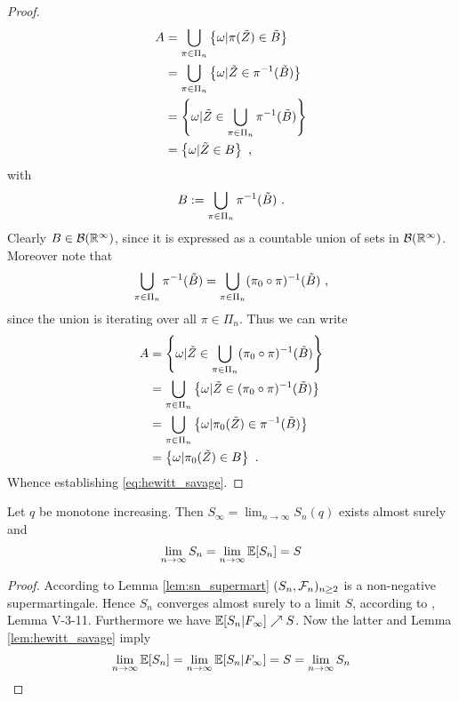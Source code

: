 \begin{lemma}
\begin{proof}
\begin{align*}
		A &= \bigcup\limits_{\pi\in\Pi_n}\left \{\omega | \pi(\tilde{Z}) \in \tilde{B}\right\}\\
		&=  \bigcup\limits_{\pi\in\Pi_n} \left\{\omega | \tilde{Z} \in \pi^{-1}(\tilde{B})\right\}\\
		&=  \left\{\omega | \tilde{Z} \in \bigcup\limits_{\pi\in\Pi_n}\pi^{-1}(\tilde{B})\right\}\\
		&= \left\{\omega | \tilde{Z} \in B\right\}\textrm{ ,}
		\end{align*}		
		with 
		$$B:=\bigcup\limits_{\pi\in\Pi_n}\pi^{-1}(\tilde{B})\textrm{ .}$$
		Clearly $B\in\mathcal{B}(\mathbb{R}^\infty)$, since it is expressed as a countable union of sets in $\mathcal{B}(\mathbb{R}^\infty)$.
		Moreover note that 
		$$\bigcup\limits_{\pi\in\Pi_n}\pi^{-1}(\tilde{B}) = \bigcup\limits_{\pi\in\Pi_n}(\pi_0\circ\pi)^{-1}(\tilde{B})\textrm{ ,}$$
		since the union is iterating over all $\pi\in\Pi_n$. Thus we can write
		\begin{align*}
		A &= \left\{\omega | \tilde{Z} \in \bigcup\limits_{\pi\in\Pi_n}(\pi_0\circ\pi)^{-1}(\tilde{B})\right\}\\
		&= \bigcup\limits_{\pi\in\Pi_n}\left\{\omega | \tilde{Z} \in (\pi_0\circ\pi)^{-1}(\tilde{B})\right\}\\
		&= \bigcup\limits_{\pi\in\Pi_n}\left\{\omega | \pi_0(\tilde{Z}) \in \pi^{-1}(\tilde{B})\right\}\\
		&= \left\{\omega | \pi_0(\tilde{Z}) \in B\right\}\textrm{ .}
		\end{align*}		
		Whence establishing \eqref{eq:hewitt_savage}.
	\end{proof}
\end{lemma}
%
\begin{thm}\label{thm:ex_limit_sn}
	Let $q$ be monotone increasing. Then $S_\infty = \lim_{n\to\infty} S_n(q)$ exists almost surely and 
	$$\lim\limits_{n\to\infty} S_n = \lim\limits_{n\to\infty} \mathbb{E}[S_n] = S$$
	\begin{proof}
		According to Lemma \ref{lem:sn_supermart} $(S_n,\mathcal{F}_n)_{n\geq 2}$ is a non-negative supermartingale. Hence $S_n$ converges almost surely to a limit $S$, according to \cite{neveu1975discrete}, Lemma V-3-11. Furthermore we have $\mathbb{E}[S_n|F_\infty] \nearrow S$. Now the latter and Lemma \ref{lem:hewitt_savage} imply
		$$\lim\limits_{n\to\infty}\mathbb{E}[S_n] = \lim\limits_{n\to\infty}\mathbb{E}[S_n|F_\infty] = S = \lim\limits_{n\to\infty}S_n$$		
	\end{proof}
\end{thm}
%